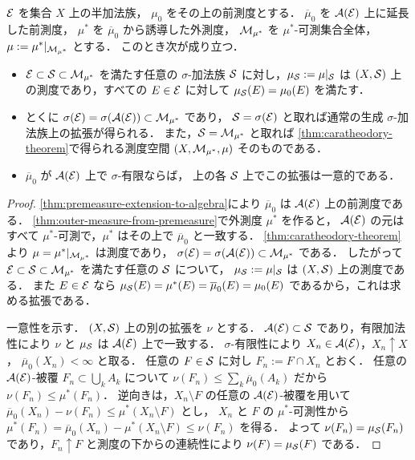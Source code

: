 \begin{theorem}\label{thm:caratheodory-hahn-extension}
$\mathcal E$ を集合 $X$ 上の半加法族，
$\mu_0$ をその上の前測度とする．
$\overline\mu_0$ を $\mathcal A(\mathcal E)$ 上に延長した前測度，
$\mu^*$ を $\overline\mu_0$ から誘導した外測度，
$\mathcal M_{\mu^*}$ を $\mu^*$-可測集合全体，
$\mu:=\mu^*|_{\mathcal M_{\mu^*}}$ とする．
このとき次が成り立つ．
\begin{itemize}
    \item $\mathcal E\subset\mathcal S\subset\mathcal M_{\mu^*}$ を満たす任意の $\sigma$-加法族
    $\mathcal S$ に対し，$\mu_{\mathcal S}:=\mu|_{\mathcal S}$ は
    $(X,\mathcal S)$ 上の測度であり，すべての $E\in\mathcal E$ に対して
    $\mu_{\mathcal S}(E)=\mu_0(E)$ を満たす．
    \item とくに $\sigma(\mathcal E)=\sigma(\mathcal A(\mathcal E))\subset\mathcal M_{\mu^*}$ であり，
    $\mathcal S=\sigma(\mathcal E)$ と取れば通常の生成 $\sigma$-加法族上の拡張が得られる．
    また，$\mathcal S=\mathcal M_{\mu^*}$ と取れば
    \cref{thm:caratheodory-theorem}で得られる測度空間
    $(X,\mathcal M_{\mu^*},\mu)$ そのものである．
    \item $\overline\mu_0$ が $\mathcal A(\mathcal E)$ 上で $\sigma$-有限ならば，
    上の各 $\mathcal S$ 上でこの拡張は一意的である．
\end{itemize}
\end{theorem}


\begin{proof}
\cref{thm:premeasure-extension-to-algebra}により
$\overline\mu_0$ は $\mathcal A(\mathcal E)$ 上の前測度である．
\cref{thm:outer-measure-from-premeasure}で外測度 $\mu^*$ を作ると，
$\mathcal A(\mathcal E)$ の元はすべて $\mu^*$-可測で，$\mu^*$ はその上で $\overline\mu_0$ と一致する．
\cref{thm:caratheodory-theorem}より
$\mu=\mu^*|_{\mathcal M_{\mu^*}}$ は測度であり，
$\sigma(\mathcal E)=\sigma(\mathcal A(\mathcal E))\subset\mathcal M_{\mu^*}$ である．
したがって $\mathcal E\subset\mathcal S\subset\mathcal M_{\mu^*}$ を満たす任意の $\mathcal S$ について，
$\mu_{\mathcal S}:=\mu|_{\mathcal S}$ は $(X,\mathcal S)$ 上の測度である．
また $E\in\mathcal E$ なら
$\mu_{\mathcal S}(E)=\mu^*(E)=\overline\mu_0(E)=\mu_0(E)$ であるから，これは求める拡張である．

一意性を示す．
$(X,\mathcal S)$ 上の別の拡張を $\nu$ とする．
$\mathcal A(\mathcal E)\subset\mathcal S$ であり，有限加法性により
$\nu$ と $\mu_{\mathcal S}$ は $\mathcal A(\mathcal E)$ 上で一致する．
$\sigma$-有限性により $X_n\in\mathcal A(\mathcal E)$，$X_n\uparrow X$，
$\overline\mu_0(X_n)<\infty$ と取る．
任意の $F\in\mathcal S$ に対し $F_n:=F\cap X_n$ とおく．
任意の $\mathcal A(\mathcal E)$-被覆 $F_n\subset\bigcup_k A_k$ について
$\nu(F_n)\le\sum_k\overline\mu_0(A_k)$ だから $\nu(F_n)\le\mu^*(F_n)$．
逆向きは，$X_n\setminus F$ の任意の $\mathcal A(\mathcal E)$-被覆を用いて
$\overline\mu_0(X_n)-\nu(F_n)\le\mu^*(X_n\setminus F)$ とし，
$X_n$ と $F$ の $\mu^*$-可測性から
$\mu^*(F_n)=\overline\mu_0(X_n)-\mu^*(X_n\setminus F)\le\nu(F_n)$ を得る．
よって $\nu(F_n)=\mu_{\mathcal S}(F_n)$ であり，$F_n\uparrow F$ と測度の下からの連続性により
$\nu(F)=\mu_{\mathcal S}(F)$ である．
\end{proof}

